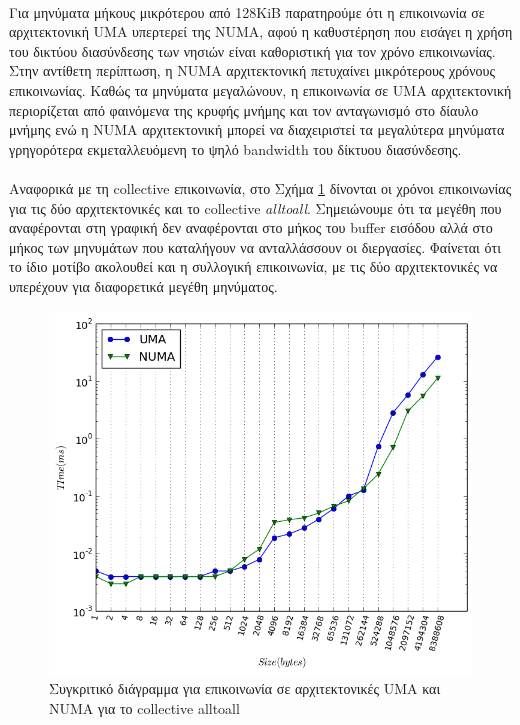 \paragraph{}
Για μηνύματα μήκους μικρότερου από 128KiB παρατηρούμε ότι η επικοινωνία σε αρχιτεκτονική UMA υπερτερεί της NUMA, αφού η καθυστέρηση που εισάγει η χρήση του δικτύου διασύνδεσης των νησιών είναι καθοριστική για τον χρόνο επικοινωνίας. Στην αντίθετη περίπτωση, η NUMA αρχιτεκτονική πετυχαίνει μικρότερους χρόνους επικοινωνίας. Καθώς τα μηνύματα μεγαλώνουν, η επικοινωνία σε UMA αρχιτεκτονική περιορίζεται από φαινόμενα της κρυφής μνήμης και τον ανταγωνισμό στο δίαυλο μνήμης ενώ η NUMA αρχιτεκτονική μπορεί να διαχειριστεί τα μεγαλύτερα μηνύματα γρηγορότερα εκμεταλλευόμενη το ψηλό bandwidth του δίκτυου διασύνδεσης. 


\paragraph{}
Αναφορικά με τη collective επικοινωνία, στο Σχήμα \ref{fig:UMAvsNUMA_alltoall} δίνονται οι χρόνοι επικοινωνίας για τις δύο αρχιτεκτονικές και το collective \textit{alltoall}. Σημειώνουμε ότι τα μεγέθη που αναφέρονται στη γραφική δεν αναφέρονται στο μήκος του buffer εισόδου αλλά στο μήκος των μηνυμάτων που καταλήγουν να ανταλλάσσουν οι διεργασίες. Φαίνεται ότι το ίδιο μοτίβο ακολουθεί και η συλλογική επικοινωνία, με τις δύο αρχιτεκτονικές να υπερέχουν για διαφορετικά μεγέθη μηνύματος. 
\begin{figure}[t]
    \centering
    \captionsetup{justification=centering,margin=0cm}
    \includegraphics[width=\textwidth]{./images/NUMAvsUMA_alltoall.png}
    \caption{Συγκριτικό διάγραμμα για επικοινωνία σε αρχιτεκτονικές UMA και NUMA για το collective alltoall}
    \label{fig:UMAvsNUMA_alltoall}
\end{figure}

